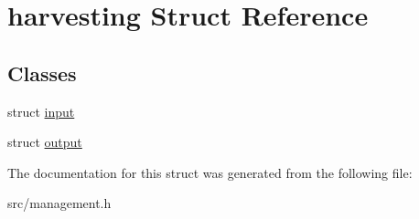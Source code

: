 \hypertarget{structharvesting}{\section{harvesting Struct Reference}
\label{structharvesting}
}
\subsection*{Classes}
\begin{DoxyCompactItemize}
\item 
struct \hyperlink{structharvesting_1_1input}{input}
\item 
struct \hyperlink{structharvesting_1_1output}{output}
\end{DoxyCompactItemize}


The documentation for this struct was generated from the following file\-:\begin{DoxyCompactItemize}
\item 
src/management.\-h\end{DoxyCompactItemize}
